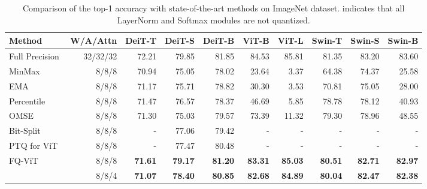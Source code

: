 \documentclass{article}
\begin{document}
\begin{table*}[t]
\centering
\small
\begin{tabular}{lrrrrrrrrr}
\toprule
Method            & W/A/Attn & DeiT-T         & DeiT-S         & DeiT-B         & ViT-B          & ViT-L          & Swin-T         & Swin-S         & Swin-B         \\
\midrule
\rowcolor{c_gray} Full Precision    & 32/32/32      & 72.21          & 79.85          & 81.85          & 84.53          & 85.81          & 81.35          & 83.20          & 83.60          \\
\midrule
MinMax            & 8/8/8         & 70.94          & 75.05          & 78.02          & 23.64          & 3.37           & 64.38          & 74.37          & 25.58          \\
EMA~\cite{jacob2018quantization}               & 8/8/8         & 71.17          & 75.71          & 78.82          & 30.30          & 3.53           & 70.81          & 75.05          & 28.00          \\
Percentile~\cite{li2019fully}        & 8/8/8         & 71.47          & 76.57          & 78.37          & 46.69          & 5.85           & 78.78          & 78.12          & 40.93          \\
OMSE~\cite{choukroun2019low}              & 8/8/8         & 71.30          & 75.03          & 79.57          & 73.39          & 11.32          & 79.30          & 78.96          & 48.55          \\
Bit-Split~\cite{wang2020towards}         & 8/8/8         & -              & 77.06          & 79.42          & -              & -              & -              & -              & -              \\
PTQ for ViT~\cite{liu2021post}       & 8/8/8         & -              & 77.47          & 80.48          & -              & -              & -              & -              & -              \\
\midrule
\multirow{2}{*}{FQ-ViT}      & 8/8/8         & \textbf{71.61} & \textbf{79.17} & \textbf{81.20} & \textbf{83.31} & \textbf{85.03} & \textbf{80.51} & \textbf{82.71} & \textbf{82.97} \\
 & 8/8/4         & \textbf{71.07} & \textbf{78.40} & \textbf{80.85} & \textbf{82.68} & \textbf{84.89} & \textbf{80.04} & \textbf{82.47} & \textbf{82.38} \\
\bottomrule
\end{tabular}
\caption{Comparison of the top-1 accuracy with state-of-the-art methods on ImageNet dataset.  indicates that all LayerNorm and Softmax modules are not quantized.}
\label{tab:img}
\end{table*}
\end{document}
